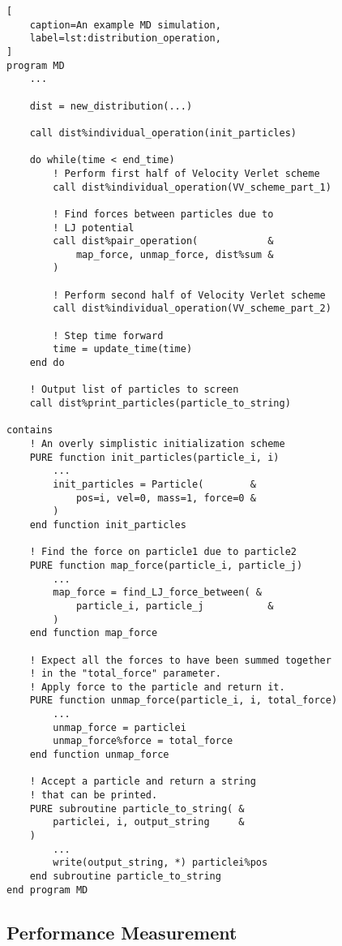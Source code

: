 \begin{lstlisting}[
    caption=An example MD simulation,
    label=lst:distribution_operation,
]
program MD
    ...

    dist = new_distribution(...)

    call dist%individual_operation(init_particles)

    do while(time < end_time)
        ! Perform first half of Velocity Verlet scheme
        call dist%individual_operation(VV_scheme_part_1)

        ! Find forces between particles due to
        ! LJ potential
        call dist%pair_operation(            &
            map_force, unmap_force, dist%sum &
        )

        ! Perform second half of Velocity Verlet scheme
        call dist%individual_operation(VV_scheme_part_2)

        ! Step time forward
        time = update_time(time)
    end do

    ! Output list of particles to screen
    call dist%print_particles(particle_to_string)

contains
    ! An overly simplistic initialization scheme
    PURE function init_particles(particle_i, i)
        ...
        init_particles = Particle(        &
            pos=i, vel=0, mass=1, force=0 &
        )
    end function init_particles

    ! Find the force on particle1 due to particle2
    PURE function map_force(particle_i, particle_j)
        ...
        map_force = find_LJ_force_between( &
            particle_i, particle_j           &
        )
    end function map_force

    ! Expect all the forces to have been summed together
    ! in the "total_force" parameter.
    ! Apply force to the particle and return it.
    PURE function unmap_force(particle_i, i, total_force)
        ...
        unmap_force = particlei
        unmap_force%force = total_force
    end function unmap_force

    ! Accept a particle and return a string
    ! that can be printed.
    PURE subroutine particle_to_string( &
        particlei, i, output_string     &
    )
        ...
        write(output_string, *) particlei%pos
    end subroutine particle_to_string
end program MD
\end{lstlisting}



\subsection{Performance Measurement}

